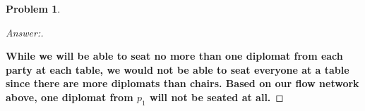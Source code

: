 \documentclass[11pt]{article}
\theoremstyle{definition}
\theoremstyle{definition}
\newtheorem{required}{Problem}
\theoremstyle{definition}
\begin{document}
\begin{required}
\begin{enumerate}[label=(\alph*)]
\begin{proof}[Answer:]
\begin{center}
\end{center}
\item \textbf{While we will be able to seat no more than one diplomat from each party at each table, we would not be able to seat everyone at a table since there are more diplomats than chairs. Based on our flow network above, one diplomat from $p_1$ will not be seated at all.}
\end{proof}

\end{enumerate}
\end{required}

\end{document}

